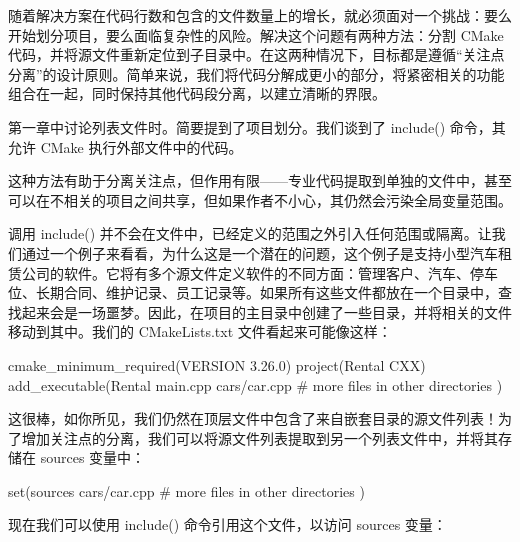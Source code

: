 随着解决方案在代码行数和包含的文件数量上的增长，就必须面对一个挑战：要么开始划分项目，要么面临复杂性的风险。解决这个问题有两种方法：分割 CMake 代码，并将源文件重新定位到子目录中。在这两种情况下，目标都是遵循“关注点分离”的设计原则。简单来说，我们将代码分解成更小的部分，将紧密相关的功能组合在一起，同时保持其他代码段分离，以建立清晰的界限。

第一章中讨论列表文件时。简要提到了项目划分。我们谈到了 include() 命令，其允许 CMake 执行外部文件中的代码。

这种方法有助于分离关注点，但作用有限——专业代码提取到单独的文件中，甚至可以在不相关的项目之间共享，但如果作者不小心，其仍然会污染全局变量范围。

调用 include() 并不会在文件中，已经定义的范围之外引入任何范围或隔离。让我们通过一个例子来看看，为什么这是一个潜在的问题，这个例子是支持小型汽车租赁公司的软件。它将有多个源文件定义软件的不同方面：管理客户、汽车、停车位、长期合同、维护记录、员工记录等。如果所有这些文件都放在一个目录中，查找起来会是一场噩梦。因此，在项目的主目录中创建了一些目录，并将相关的文件移动到其中。我们的 CMakeLists.txt 文件看起来可能像这样：


\begin{cmake}
cmake_minimum_required(VERSION 3.26.0)
project(Rental CXX)
add_executable(Rental
               main.cpp
               cars/car.cpp
               # more files in other directories
)
\end{cmake}

这很棒，如你所见，我们仍然在顶层文件中包含了来自嵌套目录的源文件列表！为了增加关注点的分离，我们可以将源文件列表提取到另一个列表文件中，并将其存储在 sources 变量中：


\begin{cmake}
set(sources
    cars/car.cpp
    # more files in other directories
)
\end{cmake}

现在我们可以使用 include() 命令引用这个文件，以访问 sources 变量：



